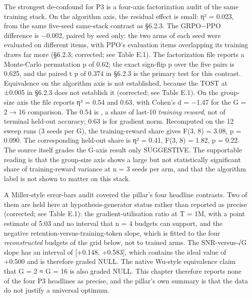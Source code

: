 \documentclass[12pt,a4paper]{report}
\DeclareRobustCommand{\longtok}[1]{\texttt{\seqsplit{#1}}}
\begin{document}
The strongest de-confound for P3 is a four-axis factorization audit of
the same training stack. On the algorithm axis, the residual effect is
small: η² = 0.023, from the same five-seed same-stack contrast as
§6.2.3. The GRPO−PPO difference is −0.002, paired by seed only: the two
arms of each seed were evaluated on different items, with PPO's
evaluation items overlapping its training draws far more (§6.2.3;
corrected; see Table E.1). The factorization file reports a Monte-Carlo
permutation p of 0.62; the exact sign-flip p over the five pairs is
0.625, and the paired t p of 0.374 in §6.2.3 is the primary test for
this contrast. Equivalence on the algorithm axis is not established,
because the TOST at ±0.005 in §6.2.3 does not establish it (corrected;
see Table E.1). On the group-size axis the file reports η² = 0.54 and
0.63, with Cohen's d = −1.47 for the G = 2 → 16 comparison. The 0.54 is
\longtok{eta2\_\allowbreak{}G\_\allowbreak{}last10}, a share of last-10 \emph{training reward}, not
of terminal held-out accuracy; 0.63 is for gradient norm. Recomputed on
the 12 sweep runs (3 seeds per G), the training-reward share gives F(3,
8) = 3.08, p = 0.090. The corresponding held-out share is η² = 0.41,
F(3, 8) = 1.82, p = 0.22. The source itself grades the G-axis result
only SUGGESTIVE. The supportable reading is that the group-size axis
shows a large but not statistically significant share of training-reward
variance at n = 3 seeds per arm, and that the algorithm label is not
shown to matter on this stack.

A Miller-style \citep{miller2024errorbars} error-bars audit covered the
pillar's four headline contrasts. Two of them are held here at
hypothesis-generator status rather than reported as precise (corrected;
see Table E.1): the gradient-utilisation ratio at T = 1M, with a point
estimate of 5.03 and no interval that n = 4 budgets can support, and the
negative retention-versus-training-token slope, which is fitted to the
four \emph{reconstructed} budgets of the grid below, not to trained
arms. The SNR-versus-√G slope has an interval of {[}+0.148, +0.583{]},
which contains the ideal value of +0.500 and is therefore graded NULL.
The native Wu-style equivalence claim that G = 2 ≈ G = 16 is also graded
NULL. This chapter therefore reports none of the four P3 headlines as
precise, and the pillar's own summary is that the data do not justify a
universal optimum.
\end{document}
